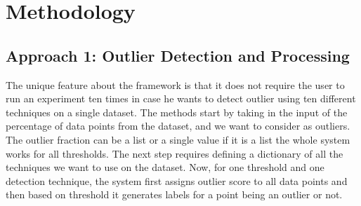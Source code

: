 \documentclass[runningheads]{llncs}
\begin{document}
\section{Methodology}
\subsection{Approach 1: Outlier Detection and Processing}

The unique feature about the framework is that it does not require the user to run an experiment ten times in case he wants to detect outlier using ten different techniques on a single dataset. The methods start by taking in the input of the percentage of data points from the dataset, and we want to consider as outliers. The outlier fraction can be a list or a single value if it is a list the whole system works for all thresholds. The next step requires defining a dictionary of all the techniques we want to use on the dataset. Now, for one threshold and one detection technique, the system first assigns outlier score to all data points and then based on threshold it generates labels for a point being an outlier or not.
\end{document}
